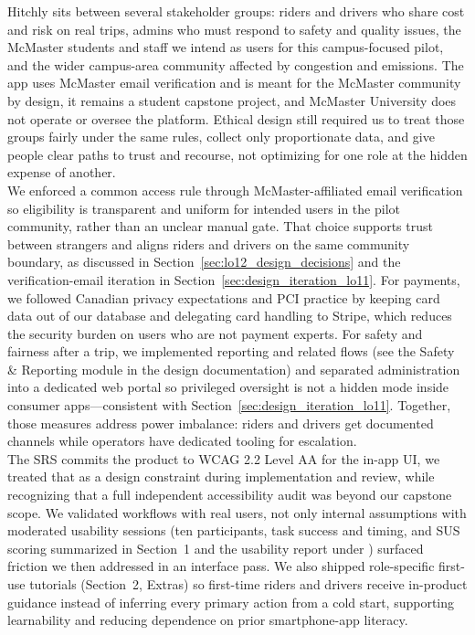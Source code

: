 \documentclass{article}
\begin{document}
\noindent Hitchly sits between several stakeholder groups: riders and drivers who share cost and risk on real trips, admins who must respond to safety and quality issues, the McMaster students and staff we intend as users for this campus-focused pilot, and the wider campus-area community affected by congestion and emissions. The app uses McMaster email verification and is meant for the McMaster community by design, it remains a student capstone project, and McMaster University does not operate or oversee the platform. Ethical design still required us to treat those groups fairly under the same rules, collect only proportionate data, and give people clear paths to trust and recourse, not optimizing for one role at the hidden expense of another.
\\
We enforced a common access rule through McMaster-affiliated email verification so eligibility is transparent and uniform for intended users in the pilot community, rather than an unclear manual gate. That choice supports trust between strangers and aligns riders and drivers on the same community boundary, as discussed in Section~\ref{sec:lo12_design_decisions} and the verification-email iteration in Section~\ref{sec:design_iteration_lo11}. For payments, we followed Canadian privacy expectations and PCI practice by keeping card data out of our database and delegating card handling to Stripe, which reduces the security burden on users who are not payment experts. For safety and fairness after a trip, we implemented reporting and related flows (see the Safety \& Reporting module in the design documentation) and separated administration into a dedicated web portal so privileged oversight is not a hidden mode inside consumer apps---consistent with Section~\ref{sec:design_iteration_lo11}. Together, those measures address power imbalance: riders and drivers get documented channels while operators have dedicated tooling for escalation.
\\
The SRS commits the product to WCAG 2.2 Level AA for the in-app UI, we treated that as a design constraint during implementation and review, while recognizing that a full independent accessibility audit was beyond our capstone scope. We validated workflows with real users, not only internal assumptions with moderated usability sessions (ten participants, task success and timing, and SUS scoring summarized in Section~1 and the usability report under ) surfaced friction we then addressed in an interface pass. We also shipped role-specific first-use tutorials (Section~2, Extras) so first-time riders and drivers receive in-product guidance instead of inferring every primary action from a cold start, supporting learnability and reducing dependence on prior smartphone-app literacy.
\end{document}
